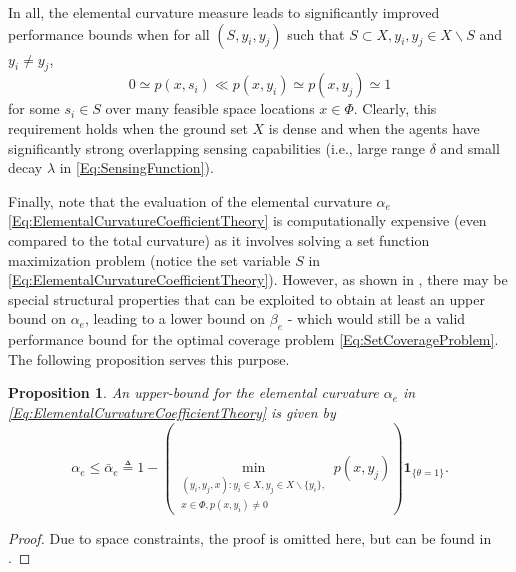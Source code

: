 \documentclass[letterpaper, 10 pt, conference]{ieeeconf}
\newcommand{\mb}[1]{\mathbf{#1}}
\newtheorem{proposition}{Proposition}
\begin{document}
In all, the elemental curvature measure leads to significantly improved performance bounds when for all $(S,y_i,y_j)$ such that $S \subset X, y_i, y_j \in X\backslash S$ and $y_i \neq y_j$,  
$$
0 \simeq p(x,s_i) \ll p(x,y_i) \simeq p(x,y_j) \simeq 1
$$
for some $s_i \in S$ over many feasible space locations $x\in\Phi$. Clearly, this requirement holds when the ground set $X$ is dense and when the agents have significantly strong overlapping sensing capabilities (i.e., large range $\delta$ and small decay $\lambda$ in \eqref{Eq:SensingFunction}). 


Finally, note that the evaluation of the elemental curvature $\alpha_e$ \eqref{Eq:ElementalCurvatureCoefficientTheory} is computationally expensive (even compared to the total curvature) as it involves solving a set function maximization problem (notice the set variable $S$ in \eqref{Eq:ElementalCurvatureCoefficientTheory}). However, as shown in \cite{Sun2019}, there may be special structural properties that can be exploited to obtain at least an upper bound on $\alpha_e$, leading to a lower bound on $\beta_e$ - which would still be a valid performance bound for the optimal coverage problem \eqref{Eq:SetCoverageProblem}. The following proposition serves this purpose.

\begin{proposition}
\label{Pr:ElementalCurvatureBound}
An upper-bound for the elemental curvature $\alpha_e$ in \eqref{Eq:ElementalCurvatureCoefficientTheory} is given by 
\begin{equation}\label{Eq:Pr:ElementalCurvatureBound}
\alpha_e \leq \bar{\alpha}_e \triangleq
1-\left(\min_{\substack{(y_i,y_j,x):y_i\in X, y_j \in X\backslash\{y_i\},\\x\in \Phi, p(x,y_i) \neq 0}} p(x,y_j)\right)\mb{1}_{\{\theta =1\}}.
\end{equation}
\end{proposition}
\begin{proof}
Due to space constraints, the proof is omitted here, but can be found in \cite{Welikala2024Ax1}. 
\end{proof}
\end{document}
